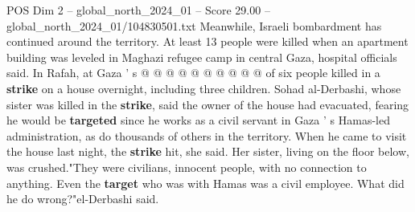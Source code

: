\begin{textsample}{POS Dim 2 – global\_north\_2024\_01 – Score 29.00 – global\_north\_2024\_01/104830501.txt}
Meanwhile, Israeli bombardment has continued around the territory.
At least 13 people were killed when an apartment building was leveled in Maghazi refugee camp in central Gaza, hospital officials said.
In Rafah, at Gaza ' s @ @ @ @ @ @ @ @ @ @ of six people killed in a \textbf{strike} on a house overnight, including three children.
Sohad al-Derbashi, whose sister was killed in the \textbf{strike}, said the owner of the house had evacuated, fearing he would be \textbf{targeted} since he works as a civil servant in Gaza ' s Hamas-led administration, as do thousands of others in the territory.
When he came to visit the house last night, the \textbf{strike} hit, she said.
Her sister, living on the floor below, was crushed."They were civilians, innocent people, with no connection to anything.
Even the \textbf{target} who was with Hamas was a civil employee.
What did he do wrong?"el-Derbashi said.

\end{textsample}
